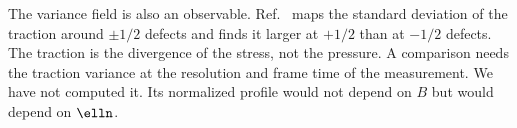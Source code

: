 The variance field is also an observable. Ref.~\cite{han2025local} maps the standard
deviation of the traction around $\pm1/2$ defects and finds it larger at $+1/2$ than at
$-1/2$ defects. The traction is the divergence of the stress, not the pressure. A
comparison needs the traction variance at the resolution and frame time of the
measurement. We have not computed it. Its normalized profile would not depend on $B$ but
would depend on $\elln$.
